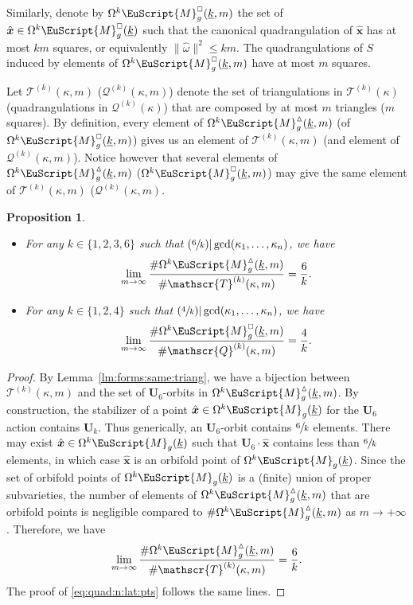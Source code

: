 \documentclass[JEP,XML,SOM,Unicode]{cedram}
\let\mathcal\EuScript
\newcommand{\Psfrac}[2]{(\sfrac{#1}{#2})}
\theoremstyle{plain}
\newtheorem{Proposition}[Theorem]{Proposition}
\theoremstyle{definition}
\newcommand{\Ub}{\mathbf{U}}
\newcommand{\Mcal}{\mathcal{M}}
\newcommand{\QQ}{\mathscr{Q}}
\newcommand{\TT}{\mathscr{T}}
\newcommand{\homg}{\hat{\omega}}
\newcommand{\hxx}{\hat{\boldsymbol{x}}}
\let\ul\underline
\newcommand{\Skdiff}{\Omega^k\mathcal{M}_{g}(\ul{k})}
\newcommand{\Qkdiff}{\Omega^k\Mcal^{\scriptscriptstyle\square}_g(\ul{k})}
\newcommand{\Tkdiffm}{\Omega^k\Mcal^\vartriangle_g(\ul{k},m)}
\newcommand{\Qkdiffm}{\Omega^k\Mcal^{\scriptscriptstyle\square}_g(\ul{k},m)}
\begin{document}
Similarly, denote by $\Qkdiffm$ the set of $\hxx\in \Qkdiff$ such that the canonical quadrangulation of $\hxx$ has at most $km$ squares, or equivalently $\|\homg\|^2 \leq km$. The quadrangulations of $S$ induced by elements of $\Qkdiffm$ have at most $m$ squares.

Let $\TT^{(k)}(\kappa,m)$ (\resp $\QQ^{(k)}(\kappa,m)$) denote the set of triangulations in $\TT^{(k)}(\kappa)$ (\resp quadrangulations in $\QQ^{(k)}(\kappa)$) that are composed by at most $m$ triangles (\resp $m$ squares). By definition, every element of $\Tkdiffm$ (\resp of~$\Qkdiffm$) gives us an element of $\TT^{(k)}(\kappa,m)$ (\resp and element of $\QQ^{(k)}(\kappa,m)$). Notice however that several elements of $\Tkdiffm$ (\resp $\Qkdiffm$) may give the same element of $\TT^{(k)}(\kappa,m)$ (\resp $\QQ^{(k)}(\kappa,m)$.

\skpt
\begin{Proposition}\label{prop:triang:n:lat:pts}
\begin{itemize}
\item
For any $k \in \{1,2,3,6\}$ such that $\Psfrac{6}{k} | \gcd(\kappa_1,\dots,\kappa_n)$, we have%
\begin{equation}\label{eq:triang:n:lat:pts}
\lim_{m\to \infty}\frac{\#\Tkdiffm}{\#\TT^{(k)}(\kappa,m)}=\frac{6}{k}.
\end{equation}

\item
For any $k\in \{1,2,4\}$ such that $\Psfrac{4}{k} | \gcd(\kappa_1,\dots,\kappa_n)$, we have
\begin{equation}\label{eq:quad:n:lat:pts}
\lim_{m\to \infty}\frac{\#\Qkdiffm}{\#\QQ^{(k)}(\kappa,m)}=\frac{4}{k}.
\end{equation}
\end{itemize}
\end{Proposition}

\begin{proof}
By Lemma~\ref{lm:forms:same:triang}, we have a bijection between $\TT^{(k)}(\kappa,m)$ and the set of $\Ub_6$\nobreakdash-orbits in $\Tkdiffm$.
By construction, the stabilizer of a point $\hxx\in \Skdiff$ for the $\Ub_6$ action contains $\Ub_k$. Thus generically, an $\Ub_6$-orbit contains $\sfrac{6}{k}$ elements. There may exist $\hxx\in \Skdiff$ such that $\Ub_6\cdot\hxx$ contains less than $\sfrac{6}{k}$ elements, in which case $\hxx$ is an orbifold point of $\Skdiff$. Since the set of orbifold points of $\Skdiff$ is a (finite) union of proper subvarieties, the number of elements of $\Tkdiffm$ that are orbifold points is negligible compared to $\#\Tkdiffm$ as $m\to +\infty$. Therefore, we have
\[
\lim_{m\to \infty}\frac{\#\Tkdiffm}{\#\TT^{(k)}(\kappa,m)}=\frac{6}{k}.
\]
The proof of \eqref{eq:quad:n:lat:pts} follows the same lines.
\end{proof}
\end{document}

